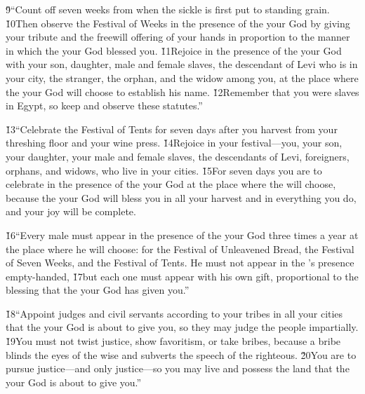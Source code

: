\v{9}``Count off seven weeks from when the sickle is first put to standing grain. \v{10}Then observe the Festival of Weeks in the presence of the  your God by giving your tribute and the freewill offering of your hands in proportion to the manner in which the  your God blessed you. \v{11}Rejoice in the presence of the  your God with your son, daughter, male and female slaves, the descendant of Levi who is in your city, the stranger, the orphan, and the widow among you, at the place where the  your God will choose to establish his name. \v{12}Remember that you were slaves in Egypt, so keep and observe these statutes.''

\v{13}``Celebrate the Festival of Tents for seven days after you harvest from your threshing floor and your wine press. \v{14}Rejoice in your festival---you, your son, your daughter, your male and female slaves, the descendants of Levi, foreigners, orphans, and widows, who live in your cities. \v{15}For seven days you are to celebrate in the presence of the  your God at the place where the  will choose, because the  your God will bless you in all your harvest and in everything you do, and your joy will be complete.

\v{16}``Every male must appear in the presence of the  your God three times a year at the place where he will choose: for the Festival of Unleavened Bread, the Festival of Seven Weeks, and the Festival of Tents. He must not appear in the 's presence empty-handed, \v{17}but each one must appear with his own gift, proportional to the blessing that the  your God has given you.''

\v{18}``Appoint judges and civil servants according to your tribes in all your cities that the  your God is about to give you, so they may judge the people impartially. \v{19}You must not twist justice, show favoritism, or take bribes, because a bribe blinds the eyes of the wise and subverts the speech of the righteous. \v{20}You are to pursue justice---and only justice---so you may live and possess the land that the  your God is about to give you.''

